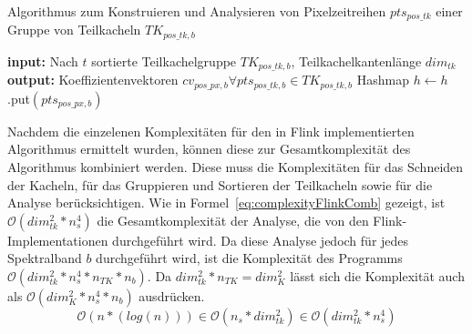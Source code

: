 \begin{algorithm}[H]
\small
\caption{Algorithmus zum Konstruieren und Analysieren von Pixelzeitreihen  $pts_{pos\_tk}$ einer Gruppe von Teilkacheln $TK_{pos\_tk, b}$}
\label{alg:regressionAlgorithm}
\begin{algorithmic}[1]
	\State \textbf{input:} Nach $t$ sortierte Teilkachelgruppe $TK_{pos\_tk, b}$, Teilkachelkantenlänge $dim_{tk}$ 
	\State \textbf{output:} Koeffizientenvektoren $cv_{pos\_px, b} \forall pts_{pos\_tk, b} \in TK_{pos\_tk, b}$
	  \label{alg:constructPTS}
        		  \label{alg:iterY1}
			\State Hashmap $h \leftarrow h$.put$(pts_{pos\_px, b})$  
		\EndFor
	\EndFor
	  \label{alg:iterTK}
		  \label{alg:iterX1}
        			  \label{alg:iterY1}
				  \label{alg:endIterTK}
			\EndFor
		\EndFor
	\EndFor
	  \label{alg:iterPTSJava}
		  \label{alg:defineSVR}
		  \label{alg:normalizeY}
		  \label{alg:constructSVR}
		  \label{alg:executeRegression}
	\EndFor
\EndFunction
\end{algorithmic}
\end{algorithm}

Nachdem die einzelenen Komplexitäten für den in Flink implementierten Algorithmus ermittelt wurden, können diese zur Gesamtkomplexität des Algorithmus kombiniert werden. Diese muss die Komplexitäten für das Schneiden der Kacheln, für das Gruppieren und Sortieren der Teilkacheln sowie für die Analyse berücksichtigen. Wie in Formel~\ref{eq:complexityFlinkComb} gezeigt, ist $\mathcal{O}(dim_{tk}^2 * n_s^4)$ die Gesamtkomplexität der Analyse, die von den Flink-Implementationen durchgeführt wird. Da diese Analyse jedoch für jedes Spektralband $b$ durchgeführt wird, ist die Komplexität des Programms $\mathcal{O}(dim_{tk}^2 * n_s^4 * n_{TK} * n_b)$. Da $dim_{tk}^2 * n_{TK} = dim_{K}^2$ lässt sich die Komplexität auch als $\mathcal{O}(dim_{K}^2 * n_s^4 * n_b)$ ausdrücken.
%
\begin{equation} \label{eq:complexityFlinkComb}
\mathcal{O}(n*(log(n))) \in \mathcal{O}(n_s * dim_{tk}^2) \in \mathcal{O}(dim_{tk}^2 * n_s^4)
\end{equation}
%
